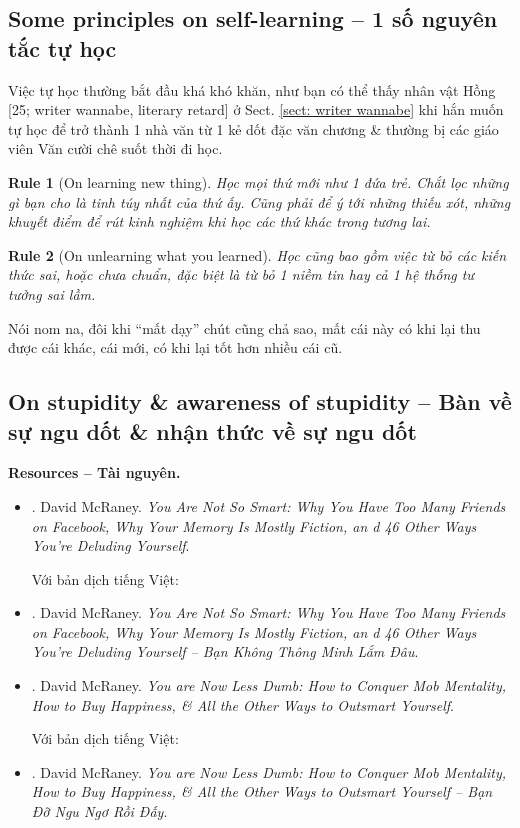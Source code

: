 \documentclass[12pt]{article}
\newtheorem{Rule}{Rule}
\begin{document}
\subsection{Some principles on self-learning -- 1 số nguyên tắc tự học}
Việc tự học thường bắt đầu khá khó khăn, như bạn có thể thấy nhân vật {\sf Hồng [25; writer wannabe, literary retard]} ở Sect. \ref{sect: writer wannabe} khi hắn muốn tự học để trở thành 1 nhà văn từ 1 kẻ dốt đặc văn chương \& thường bị các giáo viên Văn cười chê suốt thời đi học.

\begin{Rule}[On learning new thing]
	Học mọi thứ mới như 1 đứa trẻ. Chắt lọc những gì bạn cho là tinh túy nhất của thứ ấy. Cũng phải để ý tới những thiếu xót, những khuyết điểm để rút kinh nghiệm khi học các thứ khác trong tương lai.
\end{Rule}

\begin{Rule}[On unlearning what you learned]
	Học cũng bao gồm việc từ bỏ các kiến thức sai, hoặc chưa chuẩn, đặc biệt là từ bỏ 1 niềm tin hay cả 1 hệ thống tư tưởng sai lầm.
\end{Rule}
Nói nom na, đôi khi ``mất dạy'' chút cũng chả sao, mất cái này có khi lại thu được cái khác, cái mới, có khi lại tốt hơn nhiều cái cũ.

\subsection{On stupidity \& awareness of stupidity -- Bàn về sự ngu dốt \& nhận thức về sự ngu dốt}
\textbf{\textsf{Resources -- Tài nguyên.}}
\begin{itemize}
	\item \cite{McRaney_not_smart}. {\sc David McRaney}. {\it You Are Not So Smart: Why You Have Too Many Friends on Facebook, Why Your Memory Is Mostly Fiction, an d 46 Other Ways You're Deluding Yourself}.
	
	Với bản dịch tiếng Việt:
	\item \cite{McRaney_not_smart_VN}. {\sc David McRaney}. {\it You Are Not So Smart: Why You Have Too Many Friends on Facebook, Why Your Memory Is Mostly Fiction, an d 46 Other Ways You're Deluding Yourself -- Bạn Không Thông Minh Lắm Đâu}.
	\item \cite{McRaney_less_stupid}. {\sc David McRaney}. {\it You are Now Less Dumb: How to Conquer Mob Mentality, How to Buy Happiness, \& All the Other Ways to Outsmart Yourself}.
	
	Với bản dịch tiếng Việt:
	\item \cite{McRaney_not_smart_VN}. {\sc David McRaney}. {\it You are Now Less Dumb: How to Conquer Mob Mentality, How to Buy Happiness, \& All the Other Ways to Outsmart Yourself -- Bạn Đỡ Ngu Ngơ Rồi Đấy}.
\end{itemize}
\end{document}
